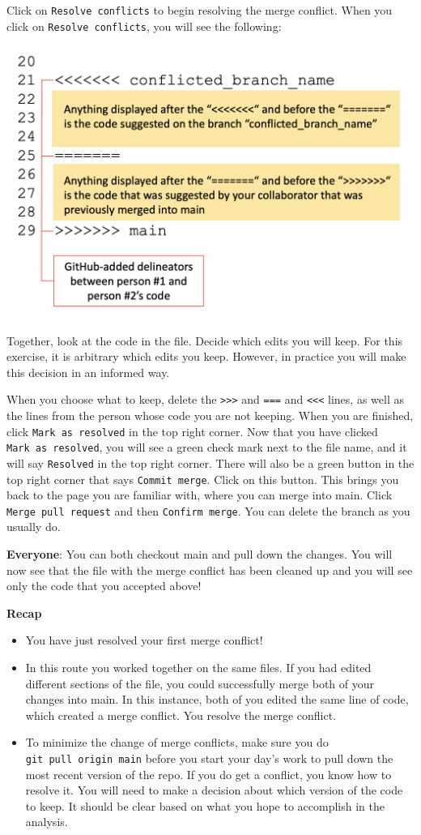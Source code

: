\documentclass[
]{book}
\providecommand{\tightlist}{%
  \setlength{\itemsep}{0pt}\setlength{\parskip}{0pt}}
\begin{document}
Click on \texttt{Resolve\ conflicts} to begin resolving the merge conflict. When you click on \texttt{Resolve\ conflicts}, you will see the following:

\includegraphics[width=0.75\linewidth]{./figures/Example-merge-conflict-github}

Together, look at the code in the file. Decide which edits you will keep. For
this exercise, it is arbitrary which edits you keep. However, in practice you
will make this decision in an informed way.

When you choose what to keep, delete the \texttt{\textgreater{}\textgreater{}\textgreater{}} and \texttt{===} and \texttt{\textless{}\textless{}\textless{}} lines, as
well as the lines from the person whose code you are not keeping. When you are
finished, click \texttt{Mark\ as\ resolved} in the top right corner. Now that you have
clicked \texttt{Mark\ as\ resolved}, you will see a green check mark next to the file
name, and it will say \texttt{Resolved} in the top right corner. There will also be a
green button in the top right corner that says \texttt{Commit\ merge}. Click on this
button. This brings you back to the page you are familiar with, where you can
merge into main. Click \texttt{Merge\ pull\ request} and then \texttt{Confirm\ merge}. You can
delete the branch as you usually do.

\textbf{Everyone}:
You can both checkout main and pull down the changes. You will now see that the file with the merge conflict has been cleaned up and you will see only the code that you accepted above!

\textbf{Recap}

\begin{itemize}
\tightlist
\item
  You have just resolved your first merge conflict!
\item
  In this route you worked together on the same files. If you had edited different
  sections of the file, you could successfully merge both of your changes into main.
  In this instance, both of you edited the same line of code, which created a
  merge conflict. You resolve the merge conflict.
\item
  To minimize the change of merge conflicts, make sure you do \texttt{git\ pull\ origin\ main} before you
  start your day's work to pull down the most recent version of the repo. If you do
  get a conflict, you know how to resolve it. You will need to make a decision about
  which version of the code to keep. It should be clear based on what you hope to
  accomplish in the analysis.
\end{itemize}
\end{document}
